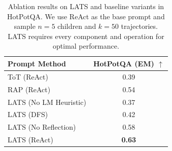 \begin{table}[t]
    \centering
    \begin{tabular}{l | c}
    \toprule
    Prompt Method & HotPotQA (EM) $\uparrow$ \\
    \midrule
    ToT (ReAct) & 0.39 \\
    RAP (ReAct) & 0.54 \\ 
    LATS (No LM Heuristic) & 0.37  \\
    LATS (DFS) & 0.42  \\
    LATS (No Reflection) & 0.58  \\
    LATS (ReAct) & \textbf{0.63} \\
    \bottomrule
    \end{tabular}
    \caption{Ablation results on LATS and baseline variants in HotPotQA. We use ReAct as the base prompt and sample $n=5$ children and $k=50$ trajectories. LATS requires every component and operation for optimal performance.}
    \label{table:abl}
\end{table}